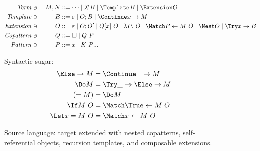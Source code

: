 \documentclass[runningheads]{llncs}
\begin{document}
\begin{figure}
\centering

\begin{alignat*}{2}
  \mathit{Term} &\ni{}& M, N
  &::= \dots
  \mid \lamstar B
  \mid \Template B
  \mid \Extension O
  \\
  \mathit{Template} &\ni{}& B
  &::= \varepsilon
  \mid O; B
  \mid \Continue x \to M
  \\
  \mathit{Extension} &\ni{}& O
  &::= \varepsilon
  \mid O; O'
  \mid Q[x] ~ O
  \mid \lambda P.~ O
  \mid \Match P \gets M ~ O
  \mid \Nest O
  \mid \Try x \to B
  \\
  \mathit{Copattern} &\ni{}& Q
  &::= \hole
  \mid Q ~ P
  \\
  \mathit{Pattern} &\ni{}& P
  &::= x
  \mid K ~ \many{P}
\end{alignat*}

Syntactic sugar:
\begin{align*}
  \Else \to M
  &=
  \Continue \_ \to M
  \\
  \Do M
  &=
  \Try \_ \to \Else \to M
  \\
  (= M)
  &=
  \Do M
  \\
  \If M ~ O
  &=
  \Match \True \gets M ~ O
  \\
  \Let x = M ~ O
  &=
  \Match x \gets M ~ O
\end{align*}
\caption{Source language: target extended with nested copatterns,
  self-referential objects, recursion templates, and composable extensions.}
\label{fig:source-syntax}
\end{figure}
\end{document}
